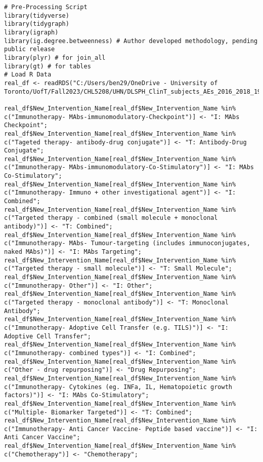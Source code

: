 \begin{verbatim}
# Pre-Processing Script
library(tidyverse)
library(tidygraph)
library(igraph)
library(ig.degree.betweenness) # Author developed methodology, pending public release
library(plyr) # for join_all
library(gt) # for tables
# Load R Data
real_df <- readRDS("C:/Users/ben29/OneDrive - University of Toronto/UofT/Fall2023/CHL5208/UHN/DLSPH_ClinT_subjects_AEs_2016_2018_19Dec2023.rds")

real_df$New_Intervention_Name[real_df$New_Intervention_Name %in% c("Immunotherapy- MAbs-immunomodulatory-Checkpoint")] <- "I: MAbs Checkpoint";
real_df$New_Intervention_Name[real_df$New_Intervention_Name %in% c("Tageted therapy- antibody-drug conjugate")] <- "T: Antibody-Drug Conjugate";
real_df$New_Intervention_Name[real_df$New_Intervention_Name %in% c("Immunotherapy- MAbs-immunomodulatory-Co-Stimulatory")] <- "I: MAbs Co-Stimulatory";
real_df$New_Intervention_Name[real_df$New_Intervention_Name %in% c("Immunotherapy- Immuno + other investigational agent")] <- "I: Combined";
real_df$New_Intervention_Name[real_df$New_Intervention_Name %in% c("Targeted therapy - combined (small molecule + monoclonal antibody)")] <- "T: Combined";
real_df$New_Intervention_Name[real_df$New_Intervention_Name %in% c("Immunotherapy- MAbs- Tumour-targeting (includes immunoconjugates, naked MAbs)")] <- "I: MAbs Targeting";
real_df$New_Intervention_Name[real_df$New_Intervention_Name %in% c("Targeted therapy - small molecule")] <- "T: Small Molecule";
real_df$New_Intervention_Name[real_df$New_Intervention_Name %in% c("Immunotherapy- Other")] <- "I: Other";
real_df$New_Intervention_Name[real_df$New_Intervention_Name %in% c("Targeted therapy - monoclonal antibody")] <- "T: Monoclonal Antibody";
real_df$New_Intervention_Name[real_df$New_Intervention_Name %in% c("Immunotherapy- Adoptive Cell Transfer (e.g. TILS)")] <- "I: Adoptive Cell Transfer";
real_df$New_Intervention_Name[real_df$New_Intervention_Name %in% c("Immunotherapy- combined types")] <- "I: Combined";
real_df$New_Intervention_Name[real_df$New_Intervention_Name %in% c("Other - drug repurposing")] <- "Drug Repurposing";
real_df$New_Intervention_Name[real_df$New_Intervention_Name %in% c("Immunotherapy- Cytokines (eg. INFa, IL, Hematopoietic growth factors)")] <- "I: MAbs Co-Stimulatory";
real_df$New_Intervention_Name[real_df$New_Intervention_Name %in% c("Multiple- Biomarker Targeted")] <- "T: Combined";
real_df$New_Intervention_Name[real_df$New_Intervention_Name %in% c("Immunotherapy- Anti Cancer Vaccine- Peptide based vaccine")] <- "I: Anti Cancer Vaccine";
real_df$New_Intervention_Name[real_df$New_Intervention_Name %in% c("Chemotherapy")] <- "Chemotherapy";

\end{verbatim}
